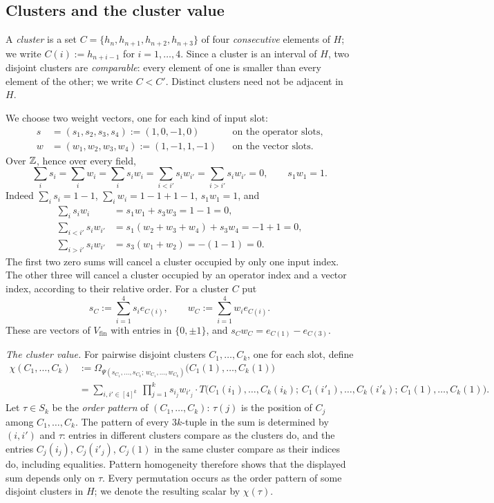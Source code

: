 \subsection{Clusters and the cluster value}
A \emph{cluster} is a set $C=\{h_n,h_{n+1},h_{n+2},h_{n+3}\}$ of four
\emph{consecutive} elements of $H$; we write $C(i):=h_{n+i-1}$ for $i=1,\dots,4$. Since a cluster is an interval of
$H$, two disjoint clusters are \emph{comparable}: every element of one is smaller than every element of the other; we
write $C<C'$. Distinct clusters need not be adjacent in $H$.

We choose two weight vectors, one for each kind of input slot:
\begin{align*}
s&=(s_1,s_2,s_3,s_4):=(1,0,-1,0)&&\text{on the operator slots},\\
w&=(w_1,w_2,w_3,w_4):=(1,-1,1,-1)&&\text{on the vector slots}.
\end{align*}
Over $\mathbb Z$, hence over every field,
\begin{equation*}\tag{W}\label{eq:W}
\sum_is_i=\sum_iw_i=\sum_is_iw_i=\sum_{i<i'}s_iw_{i'}=\sum_{i>i'}s_iw_{i'}=0,\qquad s_1w_1=1.
\end{equation*}
Indeed $\sum_is_i=1-1$, $\sum_iw_i=1-1+1-1$, $s_1w_1=1$, and
\begin{align*}
\sum_is_iw_i&=s_1w_1+s_3w_3=1-1=0,\\
\sum_{i<i'}s_iw_{i'}&=s_1(w_2+w_3+w_4)+s_3w_4=-1+1=0,\\
\sum_{i>i'}s_iw_{i'}&=s_3(w_1+w_2)=-(1-1)=0 .
\end{align*}
The first two zero sums will cancel a cluster occupied by only one input index. The other three will cancel a
cluster occupied by an operator index and a vector index, according to their relative order. For a cluster $C$ put
\[
s_C:=\sum_{i=1}^4s_ie_{C(i)},\qquad w_C:=\sum_{i=1}^4w_ie_{C(i)} .
\]
These are vectors of $V_{\mathrm{fin}}$ with entries in $\{0,\pm1\}$, and $s_Cw_C=e_{C(1)}-e_{C(3)}$.

\emph{The cluster value.} For pairwise disjoint clusters $C_1,\dots,C_k$, one for each slot, define
\begin{align*}
\chi(C_1,\dots,C_k)&:=\Omega_{\Psi(s_{C_1},\dots,s_{C_k};\,w_{C_1},\dots,w_{C_k})}\bigl(C_1(1),\dots,C_k(1)\bigr)\\
&=\sum_{i,i'\in[4]^k}\ \prod_{j=1}^ks_{i_j}w_{i'_j}\cdot
T\bigl(C_1(i_1),\dots,C_k(i_k);\,C_1(i'_1),\dots,C_k(i'_k);\,C_1(1),\dots,C_k(1)\bigr).
\end{align*}
Let $\tau\in S_k$ be the \emph{order pattern} of $(C_1,\dots,C_k)$: $\tau(j)$ is the position of $C_j$ among
$C_1,\dots,C_k$. The pattern of every $3k$\nobreakdash-tuple in the sum is determined by $(i,i')$ and $\tau$: entries in different
clusters compare as the clusters do, and the entries $C_j(i_j)$, $C_j(i'_j)$, $C_j(1)$ in the same cluster compare as
their indices do, including equalities. Pattern homogeneity therefore shows that the displayed sum depends only
on $\tau$. Every permutation occurs as the order pattern of some disjoint clusters in $H$; we denote the resulting
scalar by $\chi(\tau)$.

